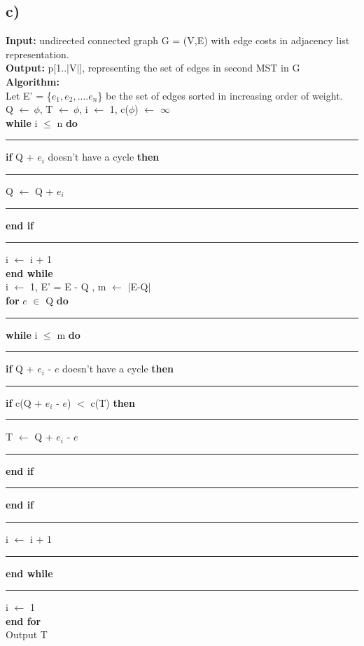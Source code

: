 \documentclass{report}
\begin{document}
  \subsection*{c)}
 \textbf{Input:} undirected connected graph G = (V,E) with edge costs in adjacency list representation.\\
 \textbf{Output:} p[1..$|$V$|$], representing the set of edges in second MST in G\\
 \textbf{Algorithm:}\\
 Let E' = \{$e_1,e_2,....e_n$\} be the set of edges sorted in increasing order of weight.\\
 Q $\leftarrow \ \phi$, T $\leftarrow \ \phi$, i $\leftarrow$ 1, c($\phi$) $\leftarrow$ $\infty$\\
 \textbf{while} i $\leq$ n \textbf{do}\\
 \noindent\rule[0.5mm]{0.5cm}{0pt} \textbf{if} Q + $e_i$ doesn't have a cycle \textbf{then}\\
 \noindent\rule[0.5mm]{1cm}{0pt} Q $\leftarrow$ Q + $e_i$\\
 \noindent\rule[0.5mm]{0.5cm}{0pt} \textbf{end if}\\
 \noindent\rule[0.5mm]{0.5cm}{0pt} i $\leftarrow$ i + 1\\
 \textbf{end while}\\
 i $\leftarrow$ 1, E' = E - Q , m $\leftarrow$ $|$E-Q$|$\\
 \textbf{for} $e$ $\in$ Q \textbf{do}\\
 \noindent\rule[0.5mm]{0.5cm}{0pt}\textbf{while} i $\leq$ m \textbf{do}\\
 \noindent\rule[0.5mm]{1cm}{0pt} \textbf{if} Q + $e_i$ - $e$ doesn't have a cycle \textbf{then}\\
 \noindent\rule[0.5mm]{1.5cm}{0pt} \textbf{if} c(Q + $e_i$ - $e$) $<$ c(T) \textbf{then}\\
 \noindent\rule[0.5mm]{2cm}{0pt} T $\leftarrow$ Q + $e_i$ - $e$\\
 \noindent\rule[0.5mm]{1.5cm}{0pt} \textbf{end if}\\
 \noindent\rule[0.5mm]{1cm}{0pt} \textbf{end if}\\
 \noindent\rule[0.5mm]{1cm}{0pt} i $\leftarrow$ i + 1\\
 \noindent\rule[0.5mm]{0.5cm}{0pt}\textbf{end while}\\
 \noindent\rule[0.5mm]{0.5cm}{0pt}i $\leftarrow$ 1\\
 \textbf{end for}\\
 Output T\\
 \vspace*{0.5em}\\
\end{document}
